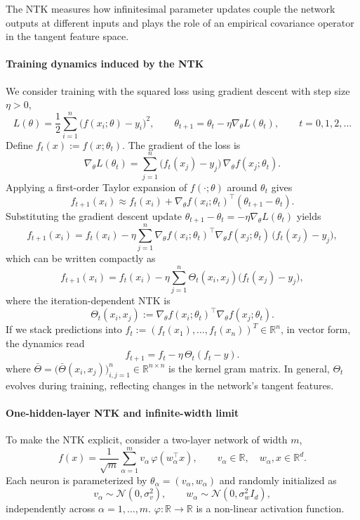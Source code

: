 The NTK measures how infinitesimal parameter updates couple the network outputs
at different inputs and plays the role of an empirical covariance operator in
the tangent feature space.

\paragraph{Training dynamics induced by the NTK}

We consider training with the squared loss using gradient descent with step size $\eta>0$,
\[
	L(\theta) = \frac{1}{2}\sum_{i=1}^n \bigl(f(x_i;\theta) - y_i\bigr)^2,
	\qquad \theta_{t+1} = \theta_t - \eta \nabla_\theta L(\theta_t),
	\qquad t = 0,1,2,\dots
\]
Define $f_t(x) := f(x;\theta_t)$. The gradient of the loss is
\[
	\nabla_\theta L(\theta_t)
	=
	\sum_{j=1}^n \bigl(f_t(x_j)-y_j\bigr)\,\nabla_\theta f(x_j;\theta_t).
\]
Applying a first-order Taylor expansion of $f(\cdot;\theta)$ around $\theta_t$
gives
\[
	f_{t+1}(x_i)
	\approx
	f_t(x_i)
	+
	\nabla_\theta f(x_i;\theta_t)^\top(\theta_{t+1}-\theta_t).
\]
Substituting the gradient descent update
$\theta_{t+1}-\theta_t = -\eta \nabla_\theta L(\theta_t)$
yields
\[
	f_{t+1}(x_i)
	=
	f_t(x_i)
	-
	\eta
	\sum_{j=1}^n
	\nabla_\theta f(x_i;\theta_t)^\top
	\nabla_\theta f(x_j;\theta_t)\,
	\bigl(f_t(x_j)-y_j\bigr),
\]
which can be written compactly as
\begin{equation}
	f_{t+1}(x_i)
	=
	f_t(x_i)
	-
	\eta
	\sum_{j=1}^n
	\Theta_t(x_i,x_j)\bigl(f_t(x_j)-y_j\bigr),
	\label{eq:ntk-prediction-dynamics}
\end{equation}
where the iteration-dependent NTK is
\[
	\Theta_t(x_i,x_j)
	:=
	\nabla_\theta f(x_i;\theta_t)^\top
	\nabla_\theta f(x_j;\theta_t).
\]
If we stack predictions into
$f_t := (f_t(x_1),\dots,f_t(x_n))^T \in \mathbb{R}^n$, in vector form, the dynamics read
\begin{equation}
	f_{t+1} = f_t - \eta\,\Theta_t (f_t - y).
	\label{eq:ntk-vector-dynamics}
\end{equation}
where $
	\bar\Theta
	=
	\bigl(\bar\Theta(x_i,x_j)\bigr)_{i,j=1}^n
	\in \mathbb{R}^{n\times n}$ is the kernel gram matrix.
In general, $\Theta_t$ evolves during training, reflecting changes in the
network’s tangent features.

\paragraph{One-hidden-layer NTK and infinite-width limit}

To make the NTK explicit, consider a two-layer network of width $m$,
\begin{equation}
	f(x)
	=
	\frac{1}{\sqrt{m}}
	\sum_{\alpha=1}^m
	v_\alpha\,\varphi(w_\alpha^\top x),
	\qquad
	v_\alpha \in \mathbb{R}, \quad w_\alpha, x \in \mathbb{R}^d.
	\label{eq:1hl-network}
\end{equation}
Each neuron is parameterized by $\theta_\alpha = (v_\alpha,w_\alpha)$ and
randomly initialized as
\[
	v_\alpha \sim \mathcal{N}(0,\sigma_v^2),
	\qquad
	w_\alpha \sim \mathcal{N}\!\left(0,\sigma_w^2I_d\right),
\]
independently across $\alpha = 1,\dots,m$. $\varphi: \mathbb{R} \to \mathbb{R}$ is a non-linear activation function.

